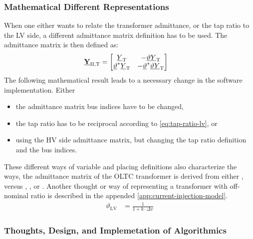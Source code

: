 \subsubsection{Mathematical Different Representations}
When one either wants to relate the transformer admittance, or the tap ratio to the \acs{LV} side, a different admittance matrix definition has to be used.
The admittance matrix is then defined as:
\begin{align}
        \underline{\mathrm{\textbf{Y}}}_\mathrm{\Pi,T}&= 
        \begin{bmatrix}
            \underline{Y}_\mathrm{T} & -\underline{\vartheta}\underline{Y}_\mathrm{T} \\
            \underline{\vartheta}^*\underline{Y}_\mathrm{T} & -\underline{\vartheta}^*\underline{\vartheta}\underline{Y}_\mathrm{T}
        \end{bmatrix} \label{eq:admittance-oltc}
    \end{align}
The following mathematical result leads to a necessary change in the software implementation.
Either
\begin{itemize}
        \item the admittance matrix bus indices have to be changed,
        \item the tap ratio has to be reciprocal according to \autoref{eq:tap-ratio-lv}, or
        \item using the \acs{HV} side admittance matrix, but changing the tap ratio definition and the bus indices.
\end{itemize}
These different ways of variable and placing definitions also characterize the ways, the admittance matrix of the \acs{OLTC} transformer is derived from either \textcite{machowski_2020}, versus \textcite{kundur_2022}, \textcite{milano_2010}, or \textcite{burlakin_2024}.
Another thought or way of representing a transformer with off-nominal ratio is described in the appended \autoref{app:current-injection-model}.
\begin{align}
        \vartheta_\mathrm{LV} &= \frac{1}{1 + k \cdot \Delta v} \label{eq:tap-ratio-lv}
\end{align}

\subsubsection{Thoughts, Design, and Implemetation of Algorithmics}

